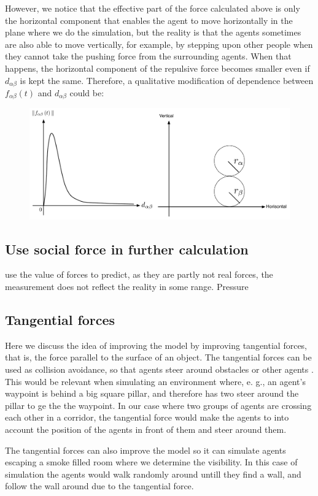 However, we notice that the effective part of the force calculated above is only the horizontal 
component that enables the agent to move horizontally in the plane where we do the simulation, 
but the reality is that the agents sometimes are also able to move vertically, for example, 
by stepping upon other people when they cannot take the pushing force from the surrounding agents. 
When that happens, the horizontal component of the repulsive force becomes smaller even if 
$d_{\alpha\beta}$ is kept the same.	
Therefore, a qualitative modification of dependence between $ f_{\alpha\beta}(t) $ 
and $ d_{\alpha\beta} $ could be:

\begin{figure}[hb]   
\centering
    {\includegraphics[scale=0.35]{Figures/ForceOverlapping.pdf}} 
    \caption{}
    \label{forceoverlapping}
\end{figure}

\subsection{Use social force in further calculation}
use the value of forces to predict, as they are partly not real forces, the measurement does not reflect the reality in some range.
Pressure

\subsection{Tangential forces}
Here we discuss the idea of improving the model by improving tangential forces, that is, the force parallel to the surface of an object.
The tangential forces can be used as collision avoidance, so that agents steer around obstacles or other agents \cite{tang1}.
This would be relevant when simulating an environment where, e. g., an agent's waypoint is behind a big square pillar, and therefore
has two steer around the pillar to ge the the waypoint.
In our case where two groups of agents are crossing each other in a corridor, the tangential force would make the agents to into account
the position of the agents in front of them and steer around them.

The tangential forces can also improve the model so it can simulate agents escaping a smoke filled room where we determine the visibility.
In this case of simulation the agents would walk randomly around untill they find a wall, and follow the wall around due to the tangential force.
